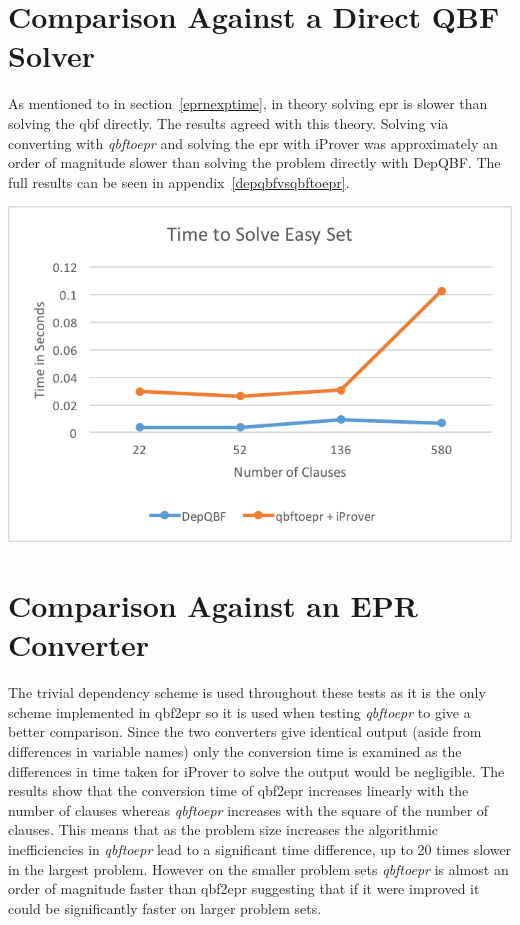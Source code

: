 \section{Comparison Against a Direct QBF Solver}
As mentioned to in section~\ref{eprnexptime}, in theory solving \gls{epr} is slower than solving the \gls{qbf} directly. The results agreed with this theory. Solving via converting with \textit{qbftoepr} and solving the \gls{epr} with iProver was approximately an order of magnitude slower than solving the problem directly with DepQBF. The full results can be seen in appendix~\ref{depqbfvsqbftoepr}. 

\begin{center}
\includegraphics{depqbfvsqbftoepr.png}
\end{center}

\section{Comparison Against an EPR Converter}
The trivial dependency scheme is used throughout these tests as it is the only scheme implemented in qbf2epr so it is used when testing \textit{qbftoepr} to give a better comparison. Since the two converters give identical output (aside from differences in variable names) only the conversion time is examined as the differences in time taken for iProver to solve the output would be negligible. The results show that the conversion time of qbf2epr increases linearly with the number of clauses whereas \textit{qbftoepr} increases with the square of the number of clauses. This means that as the problem size increases the algorithmic inefficiencies in \textit{qbftoepr} lead to a significant time difference, up to 20 times slower in the largest problem. However on the smaller problem sets \textit{qbftoepr} is almost an order of magnitude faster than qbf2epr suggesting that if it were improved it could be significantly faster on larger problem sets.


